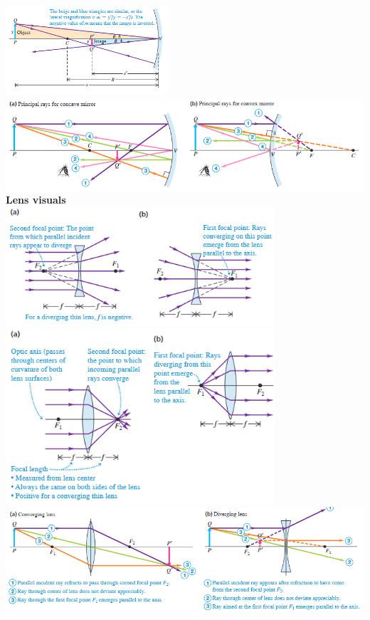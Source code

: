 \documentclass{article}
\begin{document}
\includegraphics[width=6cm]{mirror.png} \\
\includegraphics[width=20cm]{principal.png} \\
\textbf{Lens visuals} \\
\includegraphics[width=10cm]{concave_lens.png} 
\includegraphics[width=10cm]{convex_lens.png} \\
\includegraphics[width=20cm]{principal_lens.png} \\
\end{document}
